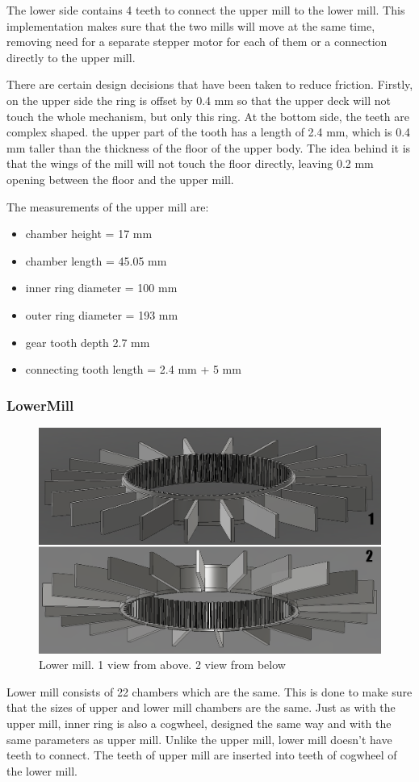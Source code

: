 The lower side contains 4 teeth to connect the upper mill to the lower mill. This implementation makes sure that the two mills will move at the same time, removing need for a separate stepper motor for each of them or a connection directly to the upper mill.

There are certain design decisions that have been taken to reduce friction. Firstly, on the upper side the ring is offset by 0.4 mm so that the upper deck will not touch the whole mechanism, but only this ring. At the bottom side, the teeth are complex shaped. the upper part of the tooth has a length of 2.4 mm, which is 0.4 mm taller than the thickness of the floor of the upper body. The idea behind it is that the wings of the mill will not touch the floor directly, leaving 0.2 mm opening between the floor and the upper mill.
 
The measurements of the upper mill are:
\begin{itemize}
	\item chamber height = 17 mm
	\item chamber length = 45.05 mm
	\item inner ring diameter = 100 mm
	\item outer ring diameter = 193 mm
	\item gear tooth depth 2.7 mm
	\item connecting tooth length = 2.4 mm + 5 mm
\end{itemize}
\newpage
\subsubsection{LowerMill}
\begin{figure}[h]
	\centering
	\includegraphics[width=0.7\linewidth]{Figures/Lowermill}
	\caption[Lower Mill]{Lower mill. 1 view from above. 2 view from below}
	\label{fig:lowermill}
\end{figure}
Lower mill consists of 22 chambers which are the same. This is done to make sure that the sizes of upper and lower mill chambers are the same. Just as with the upper mill, inner ring is also a cogwheel, designed the same way and with the same parameters as upper mill. Unlike the upper mill, lower mill doesn't have teeth to connect. The teeth of upper mill are inserted into teeth of cogwheel of the lower mill.

